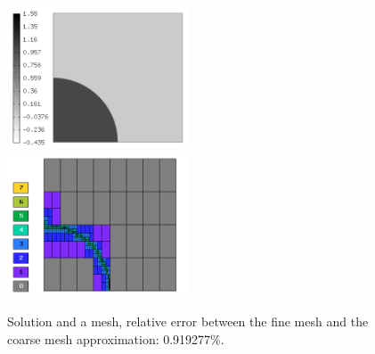 \begin{figure}[H]
\begin{center}
\includegraphics[width=0.48\textwidth]{minor_examples/Sln9.png}\ \ \ 
\includegraphics[width=0.48\textwidth]{minor_examples/Space9.png}
\end{center}
\vspace{-4mm}
\caption{Solution and a mesh, relative error between the fine mesh and the coarse mesh approximation: 0.919277\%.}
\end{figure}
